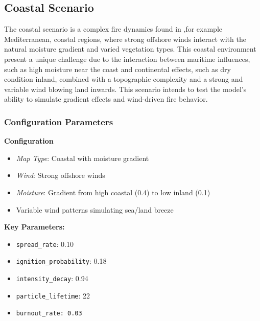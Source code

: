 \subsection{Coastal Scenario}
The coastal scenario is a complex fire dynamics found in ,for example Mediterranean, coastal regions, where strong offshore winds interact with the natural moisture gradient and varied vegetation types. This coastal environment present a unique challenge due to the interaction between maritime influences, such as high moisture near the coast and continental effects, such as dry condition inland, combined with a topographic complexity and a strong and variable wind blowing land inwards. This scenario intends to test the model's ability to simulate gradient effects and wind-driven fire behavior.
\subsubsection{Configuration Parameters}
\textbf{Configuration}
\begin{itemize}
	\item \textit{Map Type}: Coastal with moisture gradient
	\item \textit{Wind}: Strong offshore winds
	\item \textit{Moisture}: Gradient from high coastal (0.4) to low inland (0.1)
	\item Variable wind patterns simulating sea/land breeze
\end{itemize}
\textbf{Key Parameters:}
\begin{itemize}
	\item \texttt{spread\_rate}: 0.10
	\item \texttt{ignition\_probability}: 0.18
	\item \texttt{intensity\_decay}: 0.94
	\item \texttt{particle\_lifetime}: 22
	\item \texttt{burnout\_rate: 0.03}
\end{itemize}
